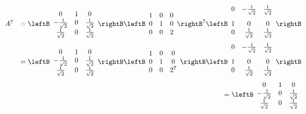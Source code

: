 \begin{solution}
\[ 
\begin{array}{rr}
A^7 & = 
\leftB 
\begin{array}{ccc}
0 & 1 & 0 \\ 
-\frac{1}{\sqrt{2}} & 0 & \frac{1}{\sqrt{2}} \\ 
\frac{1}{\sqrt{2}} & 0 & \frac{1}{\sqrt{2}}
\end{array}
\rightB
\leftB 
\begin{array}{ccc}
1 & 0 & 0 \\ 
0 & 1 & 0 \\ 
0 & 0 & 2
\end{array}
\rightB ^7
\leftB
\begin{array}{ccc}
0 & -\vspace{0.05in}\frac{1}{\sqrt{2}} & \vspace{0.05in}\frac{1}{\sqrt{2}}\\ 
1 & 0 & 0 \\ 
0 & \vspace{0.05in}\frac{1}{\sqrt{2}} & \vspace{0.05in}\frac{1}{\sqrt{2}}
\end{array} \rightB  \\
& = 
\leftB 
\begin{array}{ccc}
0 & 1 & 0 \\ 
-\frac{1}{\sqrt{2}} & 0 & \frac{1}{\sqrt{2}} \\ 
\frac{1}{\sqrt{2}} & 0 & \frac{1}{\sqrt{2}}
\end{array}
\rightB
\leftB 
\begin{array}{ccc}
1 & 0 & 0 \\ 
0 & 1 & 0 \\ 
0 & 0 & 2^7
\end{array}
\rightB 
\leftB
\begin{array}{ccc}
0 & -\vspace{0.05in}\frac{1}{\sqrt{2}} & \vspace{0.05in}\frac{1}{\sqrt{2}}\\ 
1 & 0 & 0 \\ 
0 & \vspace{0.05in}\frac{1}{\sqrt{2}} & \vspace{0.05in}\frac{1}{\sqrt{2}}
\end{array} \rightB  \\
& = 
\leftB 
\begin{array}{ccc}
0 & 1 & 0 \\ 
-\frac{1}{\sqrt{2}} & 0 & \frac{1}{\sqrt{2}} \\ 
\frac{1}{\sqrt{2}} & 0 & \frac{1}{\sqrt{2}}

\end{array}
\end{array}\]
\end{solution}
